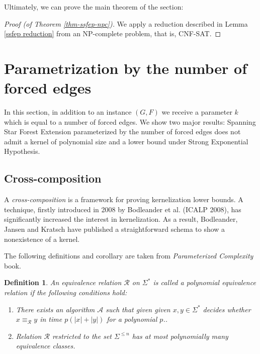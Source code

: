 \documentclass[en]{pracamgr}
\newtheorem{definition}{Definition}
\newcommand{\ssfep}{{\sc Spanning Star Forest Extension}}
\newcommand{\cnfsat}{{\sc CNF-SAT}}
\begin{document}
Ultimately, we can prove the main theorem of the section:

\begin{proof}[Proof (of Theorem \ref{thm-ssfep-npc})]
	We apply a reduction described in Lemma \ref{ssfep reduction} from an NP-complete problem, that is, \cnfsat{}.
\end{proof}

\section{Parametrization by the number of forced edges}

In this section, in addition to an instance $(G,F)$ we receive a parameter $k$ which is equal to a number of forced edges. We show two major results: \ssfep{} parameterized by the number of forced edges does not admit a kernel of polynomial size and a lower bound under Strong Exponential Hypothesis.

\subsection{Cross-composition}

A \emph{cross-composition} is a framework for proving kernelization lower bounds. A technique, firstly introduced in 2008 by Bodleander et al. (ICALP 2008), has significantly increased the interest in kernelization. As a result, Bodleander, Jansen and Kratsch have published a straightforward schema to show a nonexistence of a kernel.

The following definitions and corollary are taken from \textit{Parameterized Complexity} book. %

\begin{definition}\label{polynomial equivalence relation}
	An equivalence relation $\mathcal{R}$ on $\Sigma^*$ is called a \textup{polynomial equivalence relation} if the following conditions hold:
	\begin{enumerate}
		\item There exists an algorithm $\mathcal{A}$ such that given given $x,y \in \Sigma^*$ decides whether $x \equiv_{\mathcal{R}} y$ in time $p(|x|+|y|)$ for a polynomial $p$..
		\item Relation $\mathcal{R}$ restricted to the set $\Sigma^{\leq n}$ has at most polynomially many equivalence classes.
	\end{enumerate}
\end{definition}
\end{document}
